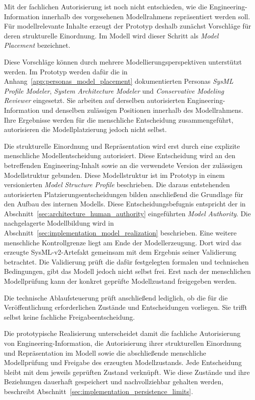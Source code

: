 Mit der fachlichen Autorisierung ist noch nicht entschieden, wie die
Engineering-Information innerhalb des vorgesehenen Modellrahmens
repräsentiert werden soll. Für modellrelevante Inhalte erzeugt der Prototyp
deshalb zunächst Vorschläge für deren strukturelle Einordnung. Im Modell wird
dieser Schritt als \emph{Model Placement} bezeichnet.

Diese Vorschläge können durch mehrere Modellierungsperspektiven unterstützt
werden. Im Prototyp werden dafür die in
Anhang~\ref{app:personas_model_placement} dokumentierten Personas
\emph{SysML Profile Modeler}, \emph{System Architecture Modeler} und
\emph{Conservative Modeling Reviewer} eingesetzt. Sie arbeiten auf
derselben autorisierten Engineering-Information und denselben zulässigen
Positionen innerhalb des Modellrahmens. Ihre Ergebnisse werden für die
menschliche Entscheidung zusammengeführt, autorisieren die
Modellplatzierung jedoch nicht selbst.

Die strukturelle Einordnung und Repräsentation wird erst durch eine
explizite menschliche Modellentscheidung autorisiert. Diese Entscheidung
wird an den betreffenden Engineering-Inhalt sowie an die verwendete Version
der zulässigen Modellstruktur gebunden. Diese Modellstruktur ist im Prototyp
in einem versionierten \emph{Model Structure Profile} beschrieben. Die
daraus entstehenden autorisierten Platzierungsentscheidungen bilden
anschließend die Grundlage für den Aufbau des internen Modells. Diese
Entscheidungsbefugnis entspricht der in
Abschnitt~\ref{sec:architecture_human_authority} eingeführten
\emph{Model Authority}. Die nachgelagerte Modellbildung wird in
Abschnitt~\ref{sec:implementation_model_realization} beschrieben.
\newpage
Eine weitere menschliche Kontrollgrenze liegt am Ende der Modellerzeugung.
Dort wird das erzeugte SysML-v2-Artefakt gemeinsam mit dem Ergebnis seiner
Validierung betrachtet. Die Validierung prüft die dafür festgelegten
formalen und technischen Bedingungen, gibt das Modell jedoch nicht selbst
frei. Erst nach der menschlichen Modellprüfung kann der konkret geprüfte
Modellzustand freigegeben werden.

Die technische Ablaufsteuerung prüft anschließend lediglich, ob die für die
Veröffentlichung erforderlichen Zustände und Entscheidungen vorliegen. Sie
trifft selbst keine fachliche Freigabeentscheidung.

Die prototypische Realisierung unterscheidet damit die fachliche
Autorisierung von Engineering-Information, die Autorisierung ihrer
strukturellen Einordnung und Repräsentation im Modell sowie die
abschließende menschliche Modellprüfung und Freigabe des erzeugten
Modellzustands. Jede Entscheidung bleibt mit dem jeweils geprüften Zustand
verknüpft. Wie diese Zustände und ihre Beziehungen dauerhaft gespeichert
und nachvollziehbar gehalten werden, beschreibt
Abschnitt~\ref{sec:implementation_persistence_limits}.


